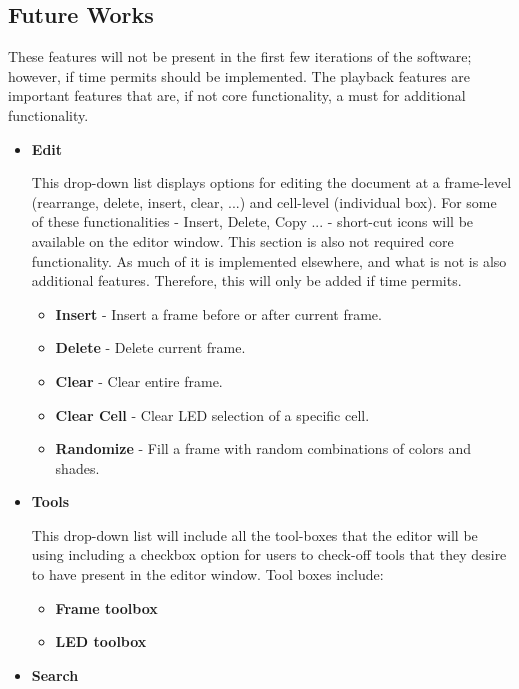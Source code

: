 \documentclass[12pt]{extarticle}
\begin{document}
\subsection{Future Works}

{These features will not be present in the first few iterations of the software; however, if time permits should be implemented.  The playback features are important features that are, if not core functionality, a must for additional functionality. }

\begin{itemize}

\item \textbf{Edit}

{This drop-down list displays options for editing the document at a frame-level (rearrange, delete, insert, clear, ...) and cell-level (individual box). For some of these functionalities - Insert, Delete, Copy ... - short-cut icons will be available on the editor window.  This section is also not required core functionality.  As much of it is implemented elsewhere, and what is not is also additional features.  Therefore, this will only be added if time permits.}

	\begin{itemize}
	\item \textbf{Insert} - Insert a frame before or after current frame.
	\item \textbf{Delete} - Delete current frame.
	\item \textbf{Clear} - Clear entire frame.
	\item \textbf{Clear Cell} - Clear LED selection of a specific cell.
	\item \textbf{Randomize} - Fill a frame with random combinations of colors and shades.
	\end{itemize}

\item \textbf{Tools}

{This drop-down list will include all the tool-boxes that the editor will be using including a checkbox option for users to check-off tools that they desire to have present in the editor window. Tool boxes include:}

	\begin{itemize}
	\item \textbf{Frame toolbox}
	\item \textbf{LED toolbox}

	\end{itemize}

\item \textbf{Search}


\end{itemize}
\end{document}
